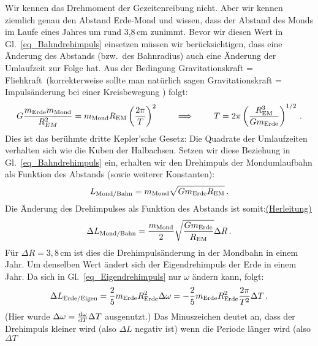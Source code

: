Wir kennen das Drehmoment der Gezeitenreibung nicht. Aber wir kennen ziemlich genau
den Abstand Erde-Mond und wissen, dass der Abstand des Monds im Laufe eines Jahres
um rund 3,8\,cm zunimmt. Bevor wir diesen Wert in Gl.\ \ref{eq_Bahndrehimpuls} einsetzen
m\"ussen wir ber\"ucksichtigen, dass eine \"Anderung des Abstands (bzw.\ des Bahnradius)
auch eine \"Anderung der Umlaufzeit zur Folge hat. Aus der Bedingung \glqq Gravitationskraft = Fliehkraft\grqq\
(korrekterweise sollte man nat\"urlich sagen \glqq Gravitationskraft = Impuls\"anderung bei einer
Kreisbewegung \grqq) folgt:
\begin{equation}
         G \frac{m_{\rm Erde} m_{\rm Mond}}{R_{EM}^2} = m_{\rm Mond} R_{\rm EM} \left( \frac{2\pi}{T} \right)^2  
          \hspace{0.8cm} \Longrightarrow \hspace{0.8cm}
          T =2 \pi  \left(  \frac{R_{\rm EM}^3}{G m_{\rm Erde}}   \right)^{1/2} \, .
\end{equation}
Dies ist das ber\"uhmte dritte Kepler'sche Gesetz: Die Quadrate der Umlaufzeiten verhalten sich wie
die Kuben der Halbachsen. Setzen wir diese Beziehung\index{Kepler'sche Gesetze!drittes} 
in Gl.\ \ref{eq_Bahndrehimpuls} ein, erhalten wir den Drehimpuls der Mondumlaufbahn
als Funktion des Abstands (sowie weiterer Konstanten):
\begin{equation}
\label{eq_BahnMond}
        L_{\rm Mond/Bahn} = m_{\rm Mond} \sqrt{G m_{\rm Erde} R_{\rm EM}} \, .
\end{equation}
Die \"Anderung des Drehimpulses als Funktion des Abstands ist somit:\hyperref[secB]{(Herleitung)}
\begin{equation}
        \Delta L_{\rm Mond/Bahn} = \frac{m_{\rm Mond}}{2} \sqrt{ \frac{G m_{\rm Erde}}{R_{\rm EM}}} \Delta R \, .
\end{equation}
F\"ur $\Delta R = 3,8$\,cm ist dies die Drehimpuls\"anderung in der Mondbahn in einem Jahr. 
Um denselben Wert \"andert sich der Eigendrehimpuls der Erde in einem Jahr. Da sich in Gl.\ \ref{eq_Eigendrehimpuls}
nur $\omega$ \"andern kann, folgt:
\begin{equation}
        \Delta L_{\rm Erde/Eigen} = \frac{2}{5} m_{\rm Erde} R_{\rm Erde}^2 \Delta \omega =
            - \frac{2}{5} m_{\rm Erde} R_{\rm Erde}^2 \frac{2 \pi }{T^2} \Delta T \, .
\end{equation}
(Hier wurde $\Delta \omega = \frac{{\rm d}\omega}{{\rm d}T} \Delta T$ ausgenutzt.) Das Minuszeichen deutet
an, dass der Drehimpuls kleiner wird (also $\Delta L$ negativ ist) wenn die Periode l\"anger wird (also $\Delta T$
